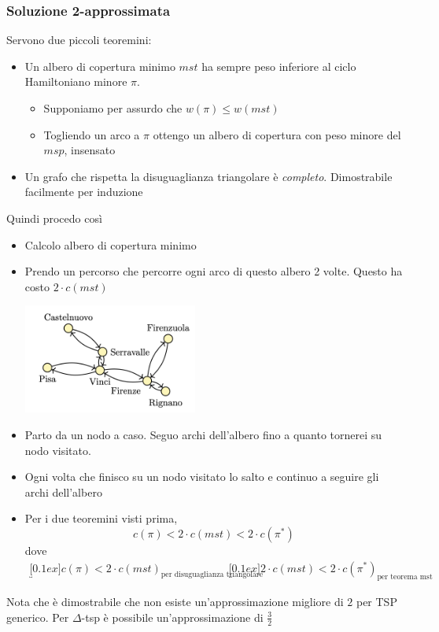 \subsubsection{Soluzione 2-approssimata}
Servono due piccoli teoremini:
\begin{itemize}
	\item Un albero di copertura minimo $ mst $ ha sempre peso inferiore al ciclo Hamiltoniano minore $ \pi $.
	      \begin{itemize}
		      \item Supponiamo per assurdo che $ w\left(\pi \right) \le w \left(mst\right) $
		      \item Togliendo un arco a $ \pi  $ ottengo un albero di copertura con peso minore del $ msp $, insensato
	      \end{itemize}
	\item Un grafo che rispetta la disuguaglianza triangolare è \textit{completo}. Dimostrabile facilmente per induzione
\end{itemize}
Quindi procedo così
\begin{itemize}
	\item Calcolo albero di copertura minimo
	\item Prendo un percorso che percorre ogni arco di questo albero 2 volte. Questo ha costo $ 2 \cdot c\left(mst\right) $
	      \begin{center}
		      \includegraphics[width = 0.45\textwidth]{images/delta tsp.png }
	      \end{center}
	\item Parto da un nodo a caso. Seguo archi dell'albero fino a quanto tornerei su nodo visitato.
	\item Ogni volta che finisco su un nodo visitato lo salto e continuo a seguire gli archi dell'albero
	\item Per i due teoremini visti prima,
	      \[
		      c\left(\pi \right) < 2 \cdot c\left(mst\right) < 2 \cdot c\left(\pi^{*}\right)
	      \]
	      dove
	      \begin{align*}
		      \underbracket[0.1ex]{c\left(\pi \right) < 2 \cdot c\left(mst\right)}_{\text{per disuguaglianza triangolare}} &  & \underbracket[0.1ex]{2 \cdot c\left(mst\right) < 2 \cdot c\left(\pi^{*}\right)}_{\text{per teorema mst}}
	      \end{align*}

\end{itemize}
Nota che è dimostrabile che non esiste un'approssimazione migliore di $ 2 $ per TSP generico. Per $ \Delta$-tsp è possibile un'approssimazione di $ \frac{3}{2} $

